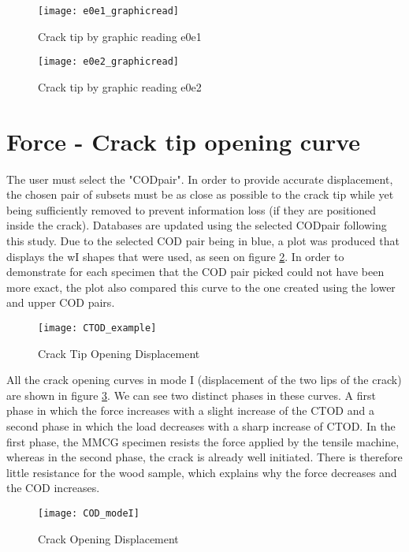 \begin{figure}[htp]
	\begin{minipage}[c]{.46\linewidth}
		\centering
		\texttt{[image: e0e1\_graphicread]}
		\caption{Crack tip by graphic reading e0e1}
		\label{fig:fig39}
	\end{minipage}
	\hfill%
	\begin{minipage}[c]{.46\linewidth}
		\centering
		\texttt{[image: e0e2\_graphicread]}
		\caption{Crack tip by graphic reading e0e2 }
		\label{fig:fig40}
	\end{minipage}
\end{figure}


\section{Force - Crack tip opening curve}

The user must select the "CODpair". In order to provide accurate displacement, the chosen pair of subsets must be as close as possible to the crack tip while yet being sufficiently removed to prevent information loss (if they are positioned inside the crack). Databases are updated using the selected CODpair following this study. Due to the selected COD pair being in blue, a plot was produced that displays the wI shapes that were used, as seen on figure \ref{fig:CTOD_example}. In order to demonstrate for each specimen that the COD pair picked could not have been more exact, the plot also compared this curve to the one created using the lower and upper COD pairs.

\begin{figure}[htp]
	\centering
	\texttt{[image: CTOD\_example]}
	\caption{Crack Tip Opening Displacement}
	\label{fig:CTOD_example}
\end{figure}

All the crack opening curves in mode I (displacement of the two lips of the crack) are shown in figure \ref{fig:COD_modeI}. 
We can see two distinct phases in these curves. A first phase in which the force increases with a slight increase of the CTOD and a second phase in which the load decreases with a sharp increase of CTOD. In the first phase, the MMCG specimen resists the force applied by the tensile machine, whereas in the second phase, the crack is already well initiated. There is therefore little resistance for the wood sample, which explains why the force decreases and the COD increases.

\begin{figure}[htp]
	\centering
	\texttt{[image: COD\_modeI]}
	\caption{Crack Opening Displacement}
	\label{fig:COD_modeI}
\end{figure}

